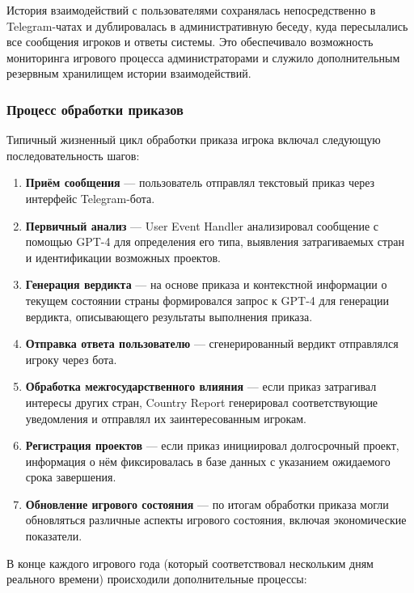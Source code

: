 История взаимодействий с пользователями сохранялась непосредственно в Telegram-чатах и дублировалась в административную беседу, куда пересылались все сообщения игроков и ответы системы. Это обеспечивало возможность мониторинга игрового процесса администраторами и служило дополнительным резервным хранилищем истории взаимодействий.

\subsubsection{Процесс обработки приказов}

Типичный жизненный цикл обработки приказа игрока включал следующую последовательность шагов:

\begin{enumerate}
    \item \textbf{Приём сообщения} — пользователь отправлял текстовый приказ через интерфейс Telegram-бота.

    \item \textbf{Первичный анализ} — User Event Handler анализировал сообщение с помощью GPT-4 для определения его типа, выявления затрагиваемых стран и идентификации возможных проектов.

    \item \textbf{Генерация вердикта} — на основе приказа и контекстной информации о текущем состоянии страны формировался запрос к GPT-4 для генерации вердикта, описывающего результаты выполнения приказа.

    \item \textbf{Отправка ответа пользователю} — сгенерированный вердикт отправлялся игроку через бота.

    \item \textbf{Обработка межгосударственного влияния} — если приказ затрагивал интересы других стран, Country Report генерировал соответствующие уведомления и отправлял их заинтересованным игрокам.

    \item \textbf{Регистрация проектов} — если приказ инициировал долгосрочный проект, информация о нём фиксировалась в базе данных с указанием ожидаемого срока завершения.

    \item \textbf{Обновление игрового состояния} — по итогам обработки приказа могли обновляться различные аспекты игрового состояния, включая экономические показатели.
\end{enumerate}

В конце каждого игрового года (который соответствовал нескольким дням реального времени) происходили дополнительные процессы:

